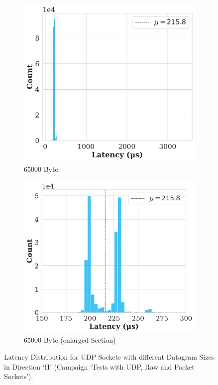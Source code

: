 \begin{figure}[h!]
  \begin{subfigure}[b]{0.45\linewidth}
    \includegraphics[width=\linewidth]{figures/performance/d_4c.pdf}
    \caption{65000 Byte}
    \label{fig:histFrag:c}
  \end{subfigure}
  \hfill
  \begin{subfigure}[b]{0.45\linewidth}
    \includegraphics[width=\linewidth]{figures/performance/d_4d.pdf}
    \caption{65000 Byte (enlarged Section)}
    \label{fig:histFrag:d}
  \end{subfigure}
  
  \caption{Latency Distribution for UDP Sockets with different Datagram Sizes in Direction `H' (Campaign `Tests with UDP, Raw and Packet Sockets').}
  \label{fig:histFrag}
\end{figure}


